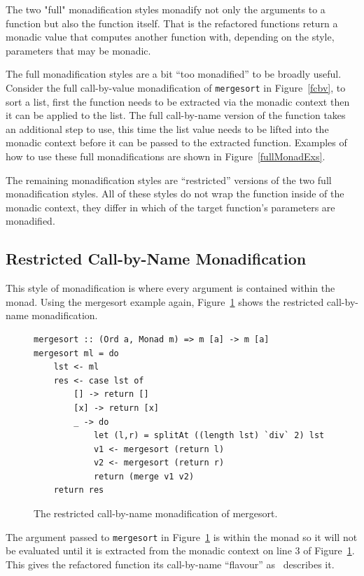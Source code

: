 The two "full" monadification styles monadify not only the arguments to a function but also the function itself. That is the refactored functions return a monadic value that computes another function with, depending on the style, parameters that may be monadic. 

The full monadification styles are a bit ``too monadified'' to be broadly useful. Consider the full call-by-value monadification of \texttt{mergesort} in Figure~\ref{fcbv}, to sort a list, first the function needs to be extracted via the monadic context then it can be applied to the list. The full call-by-name version of the function takes an additional step to use, this time the list value needs to be lifted into the monadic context before it can be passed to the extracted function. Examples of how to use these full monadifications are shown in Figure~\ref{fullMonadExs}.

The remaining monadification styles are ``restricted'' versions of the two full monadification styles. All of these styles do not wrap the function inside of the monadic context, they differ in which of the target function's parameters are monadified. 

\subsection{Restricted Call-by-Name Monadification}
This style of monadification is where every argument is contained within the monad. Using the mergesort example again, Figure~\ref{resCBN} shows the restricted call-by-name monadification.

\begin{figure}[t]
\begin{lstlisting}
mergesort :: (Ord a, Monad m) => m [a] -> m [a]
mergesort ml = do
	lst <- ml
	res <- case lst of
		[] -> return []
		[x] -> return [x]
		_ -> do 
			let (l,r) = splitAt ((length lst) `div` 2) lst
			v1 <- mergesort (return l)
			v2 <- mergesort (return r)
			return (merge v1 v2)
	return res	
\end{lstlisting}
\caption{The restricted call-by-name monadification of mergesort.}
\label{resCBN}
\end{figure}

The argument passed to \texttt{mergesort} in Figure~\ref{resCBN} is within the monad so it will not be evaluated until it is extracted from the monadic context on line 3 of Figure~\ref{resCBN}. This gives the refactored function its call-by-name ``flavour'' as~\cite{monadSurvey} describes it. 


